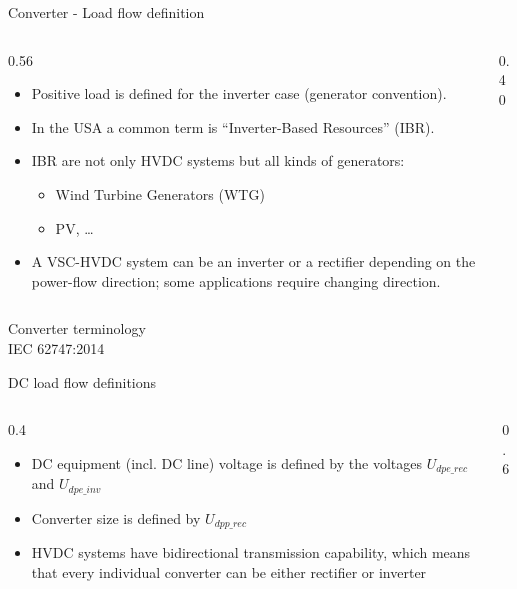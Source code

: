 \begin{frame}{Converter - Load flow definition}
  \begin{columns}[c,onlytextwidth]
    \begin{column}{0.56\textwidth}
      \begin{itemize}
        \setlength{\itemsep}{0.4em}
        \item Positive load is defined for the inverter case (generator
              convention).
        \item In the USA a common term is ``Inverter-Based Resources'' (IBR).
        \item IBR are not only HVDC systems but all kinds of generators:
          \begin{itemize}
            \item Wind Turbine Generators (WTG)
            \item PV, \ldots
          \end{itemize}
        \item A VSC-HVDC system can be an inverter or a rectifier depending
              on the power-flow direction; some applications require changing
              direction.
      \end{itemize}
    \end{column}
    \begin{column}{0.40\textwidth}\centering
    \end{column}
  \end{columns}
\end{frame}

\begin{frame}{Converter terminology}
  \centering
  \\[0.3em]
  {\color{atGray}\footnotesize IEC 62747:2014}
\end{frame}

\begin{frame}{DC load flow definitions}
  \begin{columns}[c,onlytextwidth]
    \begin{column}{0.4\textwidth}\centering
      \begin{itemize}
        \item DC equipment (incl. DC line) voltage is defined by the voltages $U_{dpe\_rec}$ and $U_{dpe\_inv}$
        \item Converter size is defined by $U_{dpp\_rec}$
        \item HVDC systems have bidirectional transmission capability, which means that every individual converter can be either rectifier or inverter
      \end{itemize}
    \end{column}
    \begin{column}{0.6\textwidth}\centering
    \end{column}
  \end{columns}
\end{frame}

